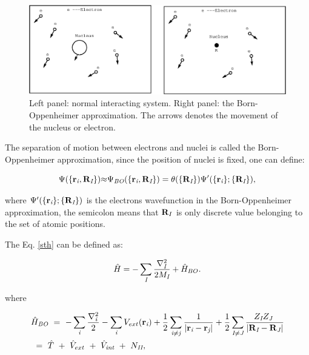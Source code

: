 \documentclass[a4paper, 12pt, titlepage,oneside,drop]{kthesis}
\begin{document}
\begin{figure}[H]
\centering
\includegraphics[scale=.7]{system.eps}
\caption{Left panel: normal interacting system. Right panel: the Born-Oppenheimer approximation. The arrows denotes the movement of the nucleus or electron.}
\label{figbo}
\end{figure}

The separation of motion between electrons and nuclei is called the Born-Oppenheimer approximation, since the position of nuclei is fixed, one can define:

\begin{equation}\label{nwf}
{\Psi(\{ {\textbf r}_{\textit i}, {\textbf R}_{\textit I} \})}  {\approx}  {\Psi_{ \textit{BO}} ( \{ {\textbf{r}_{\textit{i}}},\textbf{R}_{\textit I} \}) } = {\theta(\{{\textbf R}_{\textit I}\})} {\Psi'(\{\textbf{r}_{\textit i}\}; \{{\textbf R}_{\textit I}\})},
\end{equation}

where ${\Psi'(\{\textbf{r}_{\textit i}\}; \{{\textbf R}_{\textit I}\})}$  is the electrons wavefunction in the Born-Oppenheimer approximation, the semicolon means that $\textbf R_I$ is only discrete value belonging to the set of atomic positions. 
 
The Eq. \ref{sth} can be defined as:

\begin{equation}\label{nh}
 {\hath} = - \sumi<I> \frac{{{\nabla}_{\textit{I}}^{2}}}{2 M_\textit{I}} + {\hath}_{BO}.
\end{equation}

where 

\begin{equation}\label{both}\begin{split}
&{\hath}_\textit{BO}\ =\ - \sumi<i>   \frac{{{\nabla}_{\textit{i}}^{2}}}{2}  - \sumi<i> V_{ext}(\textbf{r}_{\textit{i}})  + \frac{1}{2} \suminj<i><j> \frac{1}{ |\textbf{r}_\textit{i}-\textbf{r}_\textit{j}|} + \frac{1}{2} \suminj<I><J> \frac{Z_\textit{I} Z_\textit{J}\ }{|\textbf{R}_\textit{I}-\textbf{R}_\textit{J}|} \\
&\ = \ \hat{T} \ + \ \hat{V}_{ext} \ + \ \hat{V}_\textit{int}\ + \ N_\textit{II},
\end{split}\end{equation}
\end{document}
